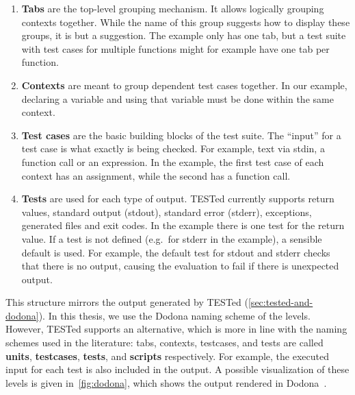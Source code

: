 \documentclass[../main]{subfiles}
\begin{document}
\begin{enumerate}
    \item \textbf{Tabs} are the top-level grouping mechanism.
          It allows logically grouping contexts together.
          While the name of this group suggests how to display these groups, it is but a suggestion.
          The example only has one tab, but a test suite with test cases for multiple functions might for example have one tab per function.
    \item \textbf{Contexts} are meant to group dependent test cases together.
          In our example, declaring a variable and using that variable must be done within the same context.
    \item \textbf{Test cases} are the basic building blocks of the test suite.
          The ``input'' for a test case is what exactly is being checked.
          For example, text via stdin, a function call or an expression.
          In the example, the first test case of each context has an assignment, while the second has a function call.
    \item \textbf{Tests} are used for each type of output.
          TESTed currently supports return values, standard output (stdout), standard error (stderr), exceptions, generated files and exit codes.
          In the example there is one test for the return value.
          If a test is not defined (e.g.\ for stderr in the example), a sensible default is used.
          For example, the default test for stdout and stderr checks that there is no output, causing the evaluation to fail if there is unexpected output.
\end{enumerate}

This structure mirrors the output generated by TESTed (\cref{sec:tested-and-dodona}).
In this thesis, we use the Dodona naming scheme of the levels.
However, TESTed supports an alternative, which is more in line with the naming schemes used in the literature: tabs, contexts, testcases, and tests are called \textbf{units}, \textbf{testcases}, \textbf{tests}, and \textbf{scripts} respectively.
For example, the executed input for each test is also included in the output.
A possible visualization of these levels is given in~\cref{fig:dodona}, which shows the output rendered in Dodona~\autocite{vanpetegemDodonaLearnCode2023}.
\end{document}
